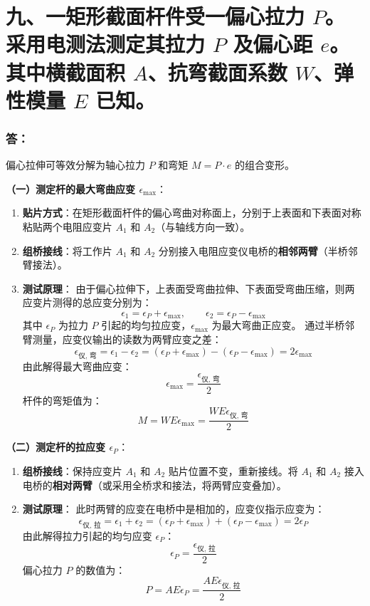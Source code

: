 \documentclass[11pt,a4paper]{ctexrep}
\begin{document}
{\section*{九、一矩形截面杆件受一偏心拉力 $P$。采用电测法测定其拉力 $P$ 及偏心距 $e$。其中横截面积 $A$、抗弯截面系数 $W$、弹性模量 $E$ 已知。}

\subsubsection*{答：}

偏心拉伸可等效分解为轴心拉力 $P$ 和弯矩 $M = P \cdot e$ 的组合变形。

\textbf{（一）测定杆的最大弯曲应变 $\epsilon_{\max}$}：
\begin{enumerate}
    \item \textbf{贴片方式}：在矩形截面杆件的偏心弯曲对称面上，分别于上表面和下表面对称粘贴两个电阻应变片 $A_1$ 和 $A_2$（与轴线方向一致）。
    \item \textbf{组桥接线}：将工作片 $A_1$ 和 $A_2$ 分别接入电阻应变仪电桥的\textbf{相邻两臂}（半桥邻臂接法）。
    \item \textbf{测试原理}：
          由于偏心拉伸下，上表面受弯曲拉伸、下表面受弯曲压缩，则两应变片测得的总应变分别为：
          \[
              \epsilon_1 = \epsilon_P + \epsilon_{\max}, \qquad \epsilon_2 = \epsilon_P - \epsilon_{\max}
          \]
          其中 $\epsilon_P$ 为拉力 $P$ 引起的均匀拉应变，$\epsilon_{\max}$ 为最大弯曲正应变。
          通过半桥邻臂测量，应变仪输出的读数为两臂应变之差：
          \[
              \epsilon_{\text{仪, 弯}} = \epsilon_1 - \epsilon_2 = (\epsilon_P + \epsilon_{\max}) - (\epsilon_P - \epsilon_{\max}) = 2\epsilon_{\max}
          \]
          由此解得最大弯曲应变：
          \[
              \epsilon_{\max} = \frac{\epsilon_{\text{仪, 弯}}}{2}
          \]
          杆件的弯矩值为：
          \[
              M = W E \epsilon_{\max} = \frac{W E \epsilon_{\text{仪, 弯}}}{2}
          \]
\end{enumerate}

\textbf{（二）测定杆的拉应变 $\epsilon_P$}：
\begin{enumerate}
    \item \textbf{组桥接线}：保持应变片 $A_1$ 和 $A_2$ 贴片位置不变，重新接线。将 $A_1$ 和 $A_2$ 接入电桥的\textbf{相对两臂}（或采用全桥求和接法，将两臂应变叠加）。
    \item \textbf{测试原理}：
          此时两臂的应变在电桥中是相加的，应变仪指示应变为：
          \[
              \epsilon_{\text{仪, 拉}} = \epsilon_1 + \epsilon_2 = (\epsilon_P + \epsilon_{\max}) + (\epsilon_P - \epsilon_{\max}) = 2\epsilon_P
          \]
          由此解得拉力引起的均匀应变 $\epsilon_P$：
          \[
              \epsilon_P = \frac{\epsilon_{\text{仪, 拉}}}{2}
          \]
          偏心拉力 $P$ 的数值为：
          \[
              P = A E \epsilon_P = \frac{A E \epsilon_{\text{仪, 拉}}}{2}
          \]
\end{enumerate}

}
\end{document}
